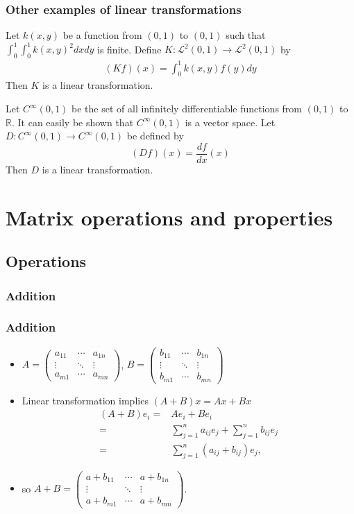 \documentclass[compress]{beamer}
\def\R{\mathbb{R}}
\newcommand{\gmatrix}[1]{\begin{pmatrix} {#1}_{11} & \cdots &
    {#1}_{1n} \\ \vdots & \ddots & \vdots \\ {#1}_{m1} & \cdots &
    {#1}_{mn} \end{pmatrix}}
\theoremstyle{definition}
\begin{document}
\begin{frame}
  \frametitle{Other examples of linear transformations}
  \begin{example}
    Let $k(x,y)$ be a function from $(0,1)$ to $(0,1)$ such that
    $\int_0^1 \int_0^1 k(x,y)^2 dx dy$ is finite.  Define
    $K:\mathcal{L}^2(0,1) \rightarrow \mathcal{L}^2(0,1)$ by
    \begin{align*}
      (K f) (x) = \int_0^1 k(x,y) f(y) dy
    \end{align*}
    Then $K$ is a linear transformation. 
  \end{example}
  \begin{example}
    Let $C^\infty(0,1)$ be the set of all infinitely differentiable
    functions from $(0,1)$ to $\R$. It can easily be shown that
    $C^\infty(0,1)$ is a vector space. Let $D:C^\infty(0,1) \rightarrow
    C^\infty(0,1)$ be defined by 
    \[ (D f) (x) = \frac{d f}{dx}(x) \]
    Then $D$ is a linear transformation.
  \end{example}
\end{frame}

\section{Matrix operations and properties}
\subsection{Operations}
\subsubsection{Addition} 
\begin{frame}
  \frametitle{Addition}
  \begin{itemize}
  \item $A = \gmatrix{a}$, $B = \gmatrix{b}$ 
  \item Linear transformation  implies $(A+B)x = Ax + Bx$
    \begin{align*}
      (A + B) e_i = & A e_i + B e_i \\
      = & \sum_{j=1}^n a_{ij} e_j + \sum_{j=1}^n b_{ij} e_j\\
      = & \sum_{j=1}^n (a_{ij} + b_{ij}) e_j,
    \end{align*}
  \item so $A + B = \gmatrix{a + b}$.
  \end{itemize}
\end{frame}
\end{document}
